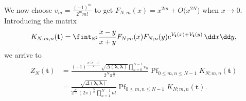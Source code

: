 We now choose $v_m = \frac{(-1)^m}{2^m m!}$ to get $F_{N;m}(x) = x^{2m} + O\bigl(x^{2N}\bigr)$ when $x \rightarrow 0$. Introducing the matrix
\[
K_{N;m,n}(\mathbf{t}) = \fint_{\mathbb{R}^2} \frac{x - y}{x + y}F_{N;m}(x)F_{N;n}(y) {\rm e}^{V_{\mathbf{t}}(x) + V_{\mathbf{t}}(y)}\, \dd x \dd y,
\]
we arrive to
\begin{equation*}
\begin{split}
Z_N(\mathbf{t}) & = \frac{(-1)^{\frac{N(N - 1)}{2}} \sqrt{\Delta(\boldsymbol{\lambda},\boldsymbol{\lambda})} \prod_{n = 0}^{N - 1} v_n}{2^N \pi^{\frac{N}{2}}}   \operatorname{Pf}_{0 \leq m,n \leq N - 1} K_{N;m,n}(\mathbf{t}) \\
& = \frac{\sqrt{\Delta(\boldsymbol{\lambda},\boldsymbol{\lambda})}}{2^{\frac{N^2}{2}} (2\pi)^{\frac{N}{2}} \prod_{n = 1}^{N - 1} n!}  \operatorname{Pf}_{0 \leq m,n \leq N - 1} K_{N;m,n}(\mathbf{t}).
\end{split}
\end{equation*}


